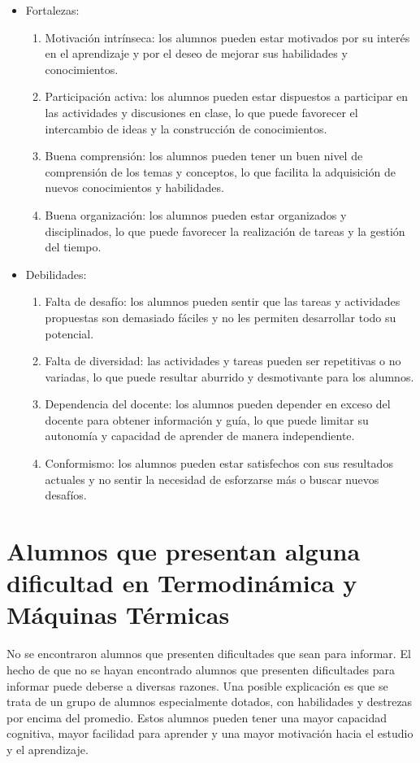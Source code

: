 \documentclass[a4paper,12pt]{book}
\newcommand{\mat}{ Termodinámica y Máquinas Térmicas}
\begin{document}
\begin{itemize}
\item Fortalezas:
\begin{enumerate}
\item Motivación intrínseca: los alumnos pueden estar motivados por su interés en el aprendizaje y por el deseo de mejorar sus habilidades y conocimientos.
\item Participación activa: los alumnos pueden estar dispuestos a participar en las actividades y discusiones en clase, lo que puede favorecer el intercambio de ideas y la construcción de conocimientos.
\item Buena comprensión: los alumnos pueden tener un buen nivel de comprensión de los temas y conceptos, lo que facilita la adquisición de nuevos conocimientos y habilidades.
\item Buena organización: los alumnos pueden estar organizados y disciplinados, lo que puede favorecer la realización de tareas y la gestión del tiempo.
\end{enumerate}
\item Debilidades:
\begin{enumerate}
    \item Falta de desafío: los alumnos pueden sentir que las tareas y actividades propuestas son demasiado fáciles y no les permiten desarrollar todo su potencial.
    \item Falta de diversidad: las actividades y tareas pueden ser repetitivas o no variadas, lo que puede resultar aburrido y desmotivante para los alumnos.
    \item Dependencia del docente: los alumnos pueden depender en exceso del docente para obtener información y guía, lo que puede limitar su autonomía y capacidad de aprender de manera independiente.
    \item Conformismo: los alumnos pueden estar satisfechos con sus resultados actuales y no sentir la necesidad de esforzarse más o buscar nuevos desafíos. 

\end{enumerate}
\end{itemize}



\section{Alumnos que presentan alguna dificultad en \mat}
No se encontraron alumnos que presenten dificultades que sean para informar.
El hecho de que no se hayan encontrado alumnos que presenten dificultades para informar puede deberse a diversas razones. Una posible explicación es que se trata de un grupo de alumnos especialmente dotados, con habilidades y destrezas por encima del promedio. Estos alumnos pueden tener una mayor capacidad cognitiva, mayor facilidad para aprender y una mayor motivación hacia el estudio y el aprendizaje.
\end{document}
